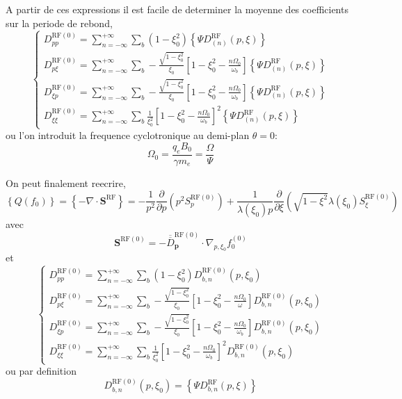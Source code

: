 A partir de ces expressions il est facile de determiner la moyenne
des coefficients sur la periode de rebond, \[
\left\{ \begin{array}{l}
D_{pp}^{\text{RF}(0)}=\sum_{n=-\infty}^{+\infty}\sum_{b}(1-\xi_{0}^{2})\left\{ \Psi D_{(n)}^{\text{RF}}(p,\xi)\right\} \\
D_{p\xi}^{\text{RF}(0)}=\sum_{n=-\infty}^{+\infty}\sum_{b}-\frac{\sqrt{1-\xi_{0}^{2}}}{\xi_{0}}\left[1-\xi_{0}^{2}-\frac{n\Omega_{0}}{\omega_{b}}\right]\left\{ \Psi D_{(n)}^{\text{RF}}(p,\xi)\right\} \\
D_{\xi p}^{\text{RF}(0)}=\sum_{n=-\infty}^{+\infty}\sum_{b}-\frac{\sqrt{1-\xi_{0}^{2}}}{\xi_{0}}\left[1-\xi_{0}^{2}-\frac{n\Omega_{0}}{\omega_{b}}\right]\left\{ \Psi D_{(n)}^{\text{RF}}(p,\xi)\right\} \\
D_{\xi\xi}^{\text{RF}(0)}=\sum_{n=-\infty}^{+\infty}\sum_{b}\frac{1}{\xi_{0}^{2}}\left[1-\xi_{0}^{2}-\frac{n\Omega_{0}}{\omega_{b}}\right]^{2}\left\{ \Psi D_{(n)}^{\text{RF}}(p,\xi)\right\} \end{array}\right.\]
 ou l'on introduit la frequence cyclotronique au demi-plan $\theta=0$:
\[
\Omega_{0}=\frac{q_{e}B_{0}}{\gamma m_{e}}=\frac{\Omega}{\Psi}\]


On peut finalement reecrire, \[
\left\{ Q(f_{0})\right\} =\left\{ -\nabla\cdot\mathbf{S}^{\text{RF}}\right\} =-\frac{1}{p^{2}}\frac{\partial}{\partial p}\left(p^{2}S_{p}^{\text{RF}(0)}\right)+\frac{1}{\lambda\left(\xi_{0}\right)p}\frac{\partial}{\partial\xi}\left(\sqrt{1-\xi^{2}}\lambda\left(\xi_{0}\right)S_{\xi}^{\text{RF}(0)}\right)\]
 avec \[
\mathbf{S}^{\text{RF}(0)}=-\overline{\overline{D}}_{\mathbf{p}}^{\text{RF}(0)}\cdot\nabla_{p,\xi_{0}}f_{0}^{(0)}\]
 et \[
\left\{ \begin{array}{l}
D_{pp}^{\text{RF}(0)}=\sum_{n=-\infty}^{+\infty}\sum_{b}(1-\xi_{0}^{2})D_{b,n}^{\text{RF}(0)}(p,\xi_{0})\\
D_{p\xi}^{\text{RF}(0)}=\sum_{n=-\infty}^{+\infty}\sum_{b}-\frac{\sqrt{1-\xi_{0}^{2}}}{\xi_{0}}\left[1-\xi_{0}^{2}-\frac{n\Omega_{0}}{\omega}\right]D_{b,n}^{\text{RF}(0)}(p,\xi_{0})\\
D_{\xi p}^{\text{RF}(0)}=\sum_{n=-\infty}^{+\infty}\sum_{b}-\frac{\sqrt{1-\xi_{0}^{2}}}{\xi_{0}}\left[1-\xi_{0}^{2}-\frac{n\Omega_{0}}{\omega_{b}}\right]D_{b,n}^{\text{RF}(0)}(p,\xi_{0})\\
D_{\xi\xi}^{\text{RF}(0)}=\sum_{n=-\infty}^{+\infty}\sum_{b}\frac{1}{\xi_{0}^{2}}\left[1-\xi_{0}^{2}-\frac{n\Omega_{0}}{\omega_{b}}\right]^{2}D_{b,n}^{\text{RF}(0)}(p,\xi_{0})\end{array}\right.\]
 ou par definition \[
D_{b,n}^{\text{RF}(0)}(p,\xi_{0})=\left\{ \Psi D_{b,n}^{\text{RF}}(p,\xi)\right\} \]


